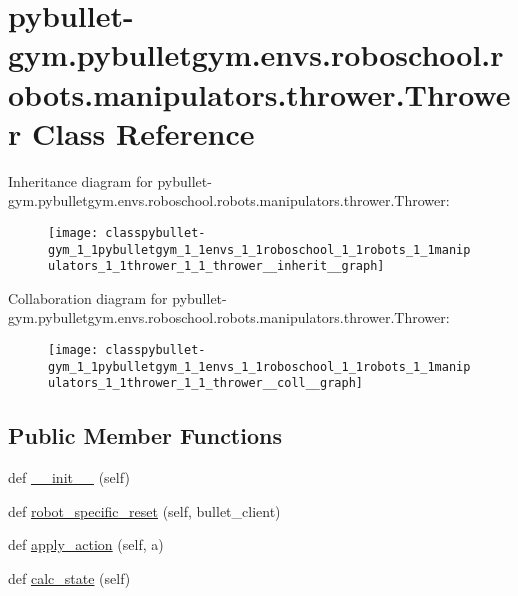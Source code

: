 \hypertarget{classpybullet-gym_1_1pybulletgym_1_1envs_1_1roboschool_1_1robots_1_1manipulators_1_1thrower_1_1_thrower}{}\section{pybullet-\/gym.pybulletgym.\+envs.\+roboschool.\+robots.\+manipulators.\+thrower.\+Thrower Class Reference}
\label{classpybullet-gym_1_1pybulletgym_1_1envs_1_1roboschool_1_1robots_1_1manipulators_1_1thrower_1_1_thrower}


Inheritance diagram for pybullet-\/gym.pybulletgym.\+envs.\+roboschool.\+robots.\+manipulators.\+thrower.\+Thrower\+:
\nopagebreak
\begin{figure}[H]
\begin{center}
\leavevmode
\texttt{[image: classpybullet-gym\_1\_1pybulletgym\_1\_1envs\_1\_1roboschool\_1\_1robots\_1\_1manipulators\_1\_1thrower\_1\_1\_thrower\_\_inherit\_\_graph]}
\end{center}
\end{figure}


Collaboration diagram for pybullet-\/gym.pybulletgym.\+envs.\+roboschool.\+robots.\+manipulators.\+thrower.\+Thrower\+:
\nopagebreak
\begin{figure}[H]
\begin{center}
\leavevmode
\texttt{[image: classpybullet-gym\_1\_1pybulletgym\_1\_1envs\_1\_1roboschool\_1\_1robots\_1\_1manipulators\_1\_1thrower\_1\_1\_thrower\_\_coll\_\_graph]}
\end{center}
\end{figure}
\subsection*{Public Member Functions}
\begin{DoxyCompactItemize}
\item 
def \hyperlink{classpybullet-gym_1_1pybulletgym_1_1envs_1_1roboschool_1_1robots_1_1manipulators_1_1thrower_1_1_thrower_a2db59bbba9a000c1b9046bd9a3e2d0e2}{\+\_\+\+\_\+init\+\_\+\+\_\+} (self)
\item 
def \hyperlink{classpybullet-gym_1_1pybulletgym_1_1envs_1_1roboschool_1_1robots_1_1manipulators_1_1thrower_1_1_thrower_a63ce9c630c465b06abee1d4a64bb7103}{robot\+\_\+specific\+\_\+reset} (self, bullet\+\_\+client)
\item 
def \hyperlink{classpybullet-gym_1_1pybulletgym_1_1envs_1_1roboschool_1_1robots_1_1manipulators_1_1thrower_1_1_thrower_afd4794567e134d229a32a5739fdfb213}{apply\+\_\+action} (self, a)
\item 
def \hyperlink{classpybullet-gym_1_1pybulletgym_1_1envs_1_1roboschool_1_1robots_1_1manipulators_1_1thrower_1_1_thrower_a8d9b5ec8803777206300e864ae16e147}{calc\+\_\+state} (self)
\end{DoxyCompactItemize}
